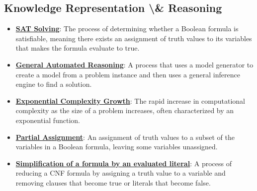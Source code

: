 \documentclass{article}%
\begin{document}
%
\subsection{Knowledge Representation \textbackslash{}\& Reasoning}%
\label{subsec:KnowledgeRepresentationReasoning}%
\begin{itemize}[leftmargin=*]%
\item \href{https://purdue.brightspace.com/d2l/common/assets/pdfjs-d2l-dist/1.0.14-legacy/web/viewer.html?file=%2Fcontent%2Fenforced%2F1095467-wl.202510.CS.24300.001%2F15L2-SAT.pdf%3Fou%3D1095467&lang=en-us&container=d2l-fileviewer-rendered-pdf&fullscreen=d2l-fileviewer-rendered-pdf-dialog&height=667#page=2}{\textbf{SAT Solving}}: The process of determining whether a Boolean formula is satisfiable, meaning there exists an assignment of truth values to its variables that makes the formula evaluate to true.%
\item \href{https://purdue.brightspace.com/d2l/common/assets/pdfjs-d2l-dist/1.0.14-legacy/web/viewer.html?file=%2Fcontent%2Fenforced%2F1095467-wl.202510.CS.24300.001%2F15L2-SAT.pdf%3Fou%3D1095467&lang=en-us&container=d2l-fileviewer-rendered-pdf&fullscreen=d2l-fileviewer-rendered-pdf-dialog&height=667#page=3}{\textbf{General Automated Reasoning}}: A process that uses a model generator to create a model from a problem instance and then uses a general inference engine to find a solution.%
\item \href{https://purdue.brightspace.com/d2l/common/assets/pdfjs-d2l-dist/1.0.14-legacy/web/viewer.html?file=%2Fcontent%2Fenforced%2F1095467-wl.202510.CS.24300.001%2F15L2-SAT.pdf%3Fou%3D1095467&lang=en-us&container=d2l-fileviewer-rendered-pdf&fullscreen=d2l-fileviewer-rendered-pdf-dialog&height=667#page=4}{\textbf{Exponential Complexity Growth}}: The rapid increase in computational complexity as the size of a problem increases, often characterized by an exponential function.%
\item \href{https://purdue.brightspace.com/d2l/common/assets/pdfjs-d2l-dist/1.0.14-legacy/web/viewer.html?file=%2Fcontent%2Fenforced%2F1095467-wl.202510.CS.24300.001%2F15L2-SAT.pdf%3Fou%3D1095467&lang=en-us&container=d2l-fileviewer-rendered-pdf&fullscreen=d2l-fileviewer-rendered-pdf-dialog&height=667#page=14}{\textbf{Partial Assignment}}: An assignment of truth values to a subset of the variables in a Boolean formula, leaving some variables unassigned.%
\item \href{https://purdue.brightspace.com/d2l/common/assets/pdfjs-d2l-dist/1.0.14-legacy/web/viewer.html?file=%2Fcontent%2Fenforced%2F1095467-wl.202510.CS.24300.001%2F15L2-SAT.pdf%3Fou%3D1095467&lang=en-us&container=d2l-fileviewer-rendered-pdf&fullscreen=d2l-fileviewer-rendered-pdf-dialog&height=667#page=15}{\textbf{Simplification of a formula by an evaluated literal}}: A process of reducing a CNF formula by assigning a truth value to a variable and removing clauses that become true or literals that become false.%

\end{itemize}
\end{document}
